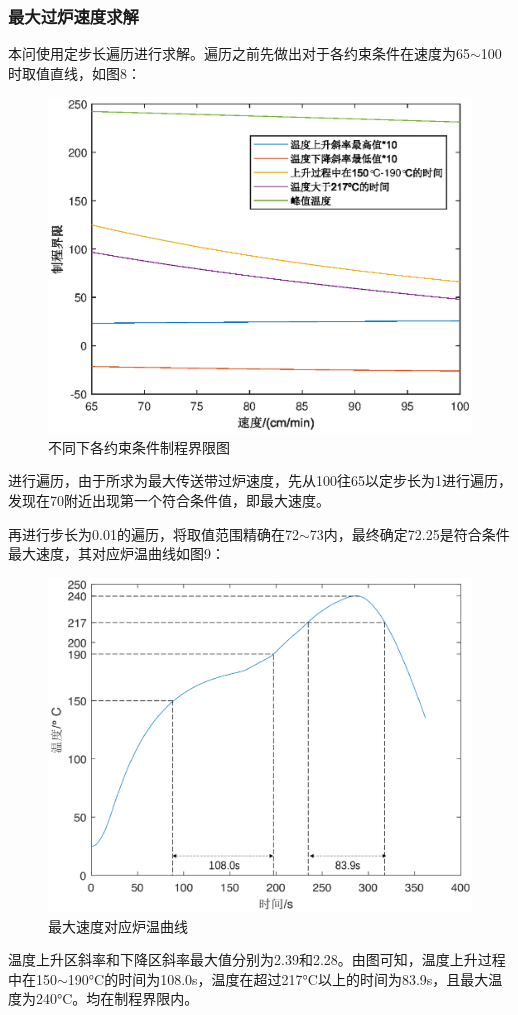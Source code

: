 \documentclass[a4paper,12pt]{ctexart} %
\begin{document}
	\subsubsection{最大过炉速度求解}
	本问使用定步长遍历进行求解。遍历之前先做出对于各约束条件在速度为65$\sim$100时取值直线，如图8：
	\begin{figure}[H]
		\centering
		\includegraphics[scale=0.65]{Q2-1}
		\caption{不同下各约束条件制程界限图}
	\end{figure}\par
	进行遍历，由于所求为最大传送带过炉速度，先从100往65以定步长为1进行遍历，发现在70附近出现第一个符合条件值，即最大速度。\par
	再进行步长为0.01的遍历，将取值范围精确在72$\sim$73内，最终确定72.25是符合条件最大速度，其对应炉温曲线如图9：\par
	\begin{figure}[H]
		\centering
		\includegraphics[scale=0.5]{Q2-2}
		\caption{最大速度对应炉温曲线}
	\end{figure}\par
	温度上升区斜率和下降区斜率最大值分别为2.39和2.28。由图可知，温度上升过程中在150$\sim$190°C的时间为108.0s，温度在超过217°C以上的时间为83.9s，且最大温度为240°C。均在制程界限内。
\end{document}
